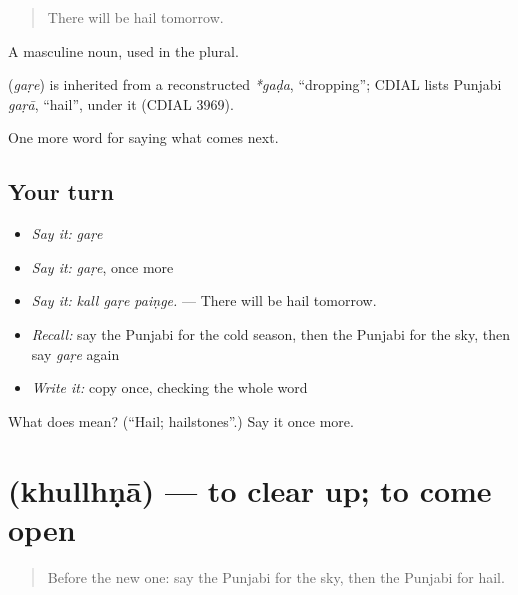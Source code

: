 \begin{quote}
There will be hail tomorrow.
\end{quote}

A masculine noun, used in the plural.

\begin{cousinweb}
\textbf{} (\emph{gaṛe}) is inherited from a reconstructed \emph{*gaḍa}, \textquotedblleft{}dropping\textquotedblright{}; CDIAL lists Punjabi \emph{gaṛā}, \textquotedblleft{}hail\textquotedblright{}, under it (CDIAL 3969).
\end{cousinweb}

\begin{grammarlens}[title={What you've built}]
One more word for saying what comes next.
\end{grammarlens}

\subsection*{Your turn}
\begin{itemize}
\raggedright
  \item \emph{Say it:} \emph{gaṛe}
  \item \emph{Say it:} \emph{gaṛe}, once more
  \item \emph{Say it:} \emph{kall gaṛe paiṇge.} — There will be hail tomorrow.
  \item \emph{Recall:} say the Punjabi for the cold season, then the Punjabi for the sky, then say \emph{gaṛe} again
  \item \emph{Write it:} copy \textbf{} once, checking the whole word
\end{itemize}

\begin{tcolorbox}[breakable,colback=teal!4,colframe=teal!35!black,title={Before you move on}]
What does  mean? (\textquotedblleft{}Hail; hailstones\textquotedblright{}.) Say it once more.
\end{tcolorbox}
\section[\texorpdfstring{\pa{ਖੁੱਲ੍ਹਣਾ} (khullhṇā)}{ਖੁੱਲ੍ਹਣਾ (khullhṇā)}]{ (khullhṇā) — to clear up; to come open}

\label{lesson:PA-C290-khullhna}



\begin{quote}
Before the new one: say the Punjabi for the sky, then the Punjabi for hail.
\end{quote}

